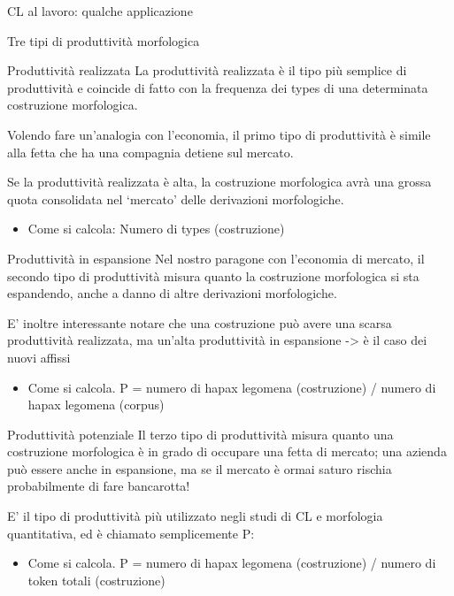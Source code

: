 \documentclass[pdf]{prosper}
\begin{document}
\begin{tsectionandpart}{CL al lavoro: qualche applicazione}
\begin{slide}{Tre tipi di produttività morfologica}
\end{slide}

\begin{slide}{Produttività realizzata}
La produttività realizzata è il tipo più semplice di produttività e coincide di fatto con la frequenza dei types di una determinata costruzione morfologica.

Volendo fare un'analogia con l'economia, il primo tipo di produttività è simile alla fetta che ha una compagnia detiene sul mercato.

Se la produttività realizzata è alta, la costruzione morfologica avrà una grossa quota consolidata nel `mercato' delle derivazioni morfologiche.


	\begin{itemize}
		\item Come si calcola: Numero di types (costruzione)
	\end{itemize}

\end{slide}

\begin{slide}{Produttività in espansione}
Nel nostro paragone con l'economia di mercato, il secondo tipo di produttività misura quanto la costruzione morfologica si sta espandendo, anche a danno di altre derivazioni morfologiche. 

E' inoltre interessante notare che una costruzione può avere una scarsa produttività realizzata, ma un'alta produttività in espansione -> è il caso dei nuovi affissi

	\begin{itemize}
		\item Come si calcola. P = numero di hapax legomena (costruzione) / numero di hapax legomena (corpus)
	\end{itemize}

\end{slide}

\begin{slide}{Produttività potenziale}
Il terzo tipo di produttività misura quanto una costruzione morfologica è in grado di occupare una fetta di mercato; una azienda può essere anche in espansione, ma se il mercato è ormai saturo rischia probabilmente di fare bancarotta!

E' il tipo di produttività più utilizzato negli studi di CL e morfologia quantitativa, ed è chiamato semplicemente P:

\begin{itemize}
\item Come si calcola. P = numero di hapax legomena (costruzione) / numero di token totali (costruzione)
\end{itemize}


\end{slide}
\end{tsectionandpart}
\end{document}
